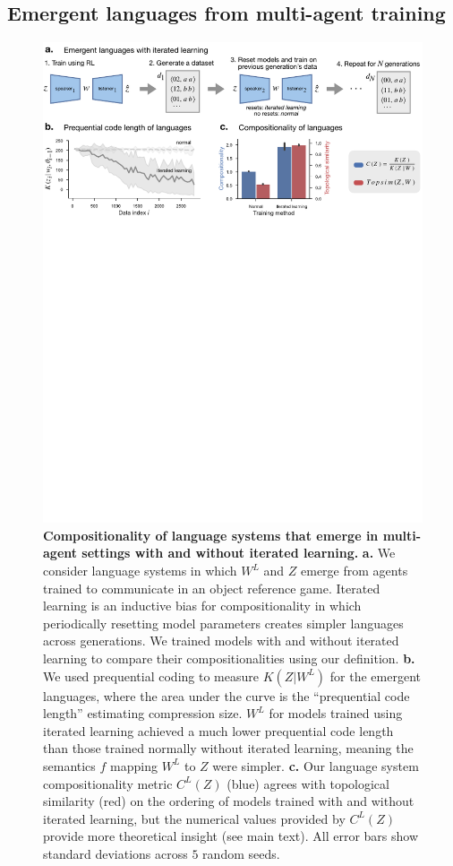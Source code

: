 \documentclass{article} %
\begin{document}
\subsection{Emergent languages from multi-agent training}
\label{sec:emergent}

\begin{figure}[ht]
    \centering
    \includegraphics[width=\linewidth]{figures/emergent.pdf}
    \caption{\textbf{Compositionality of language systems that emerge in multi-agent settings with and without iterated learning.} \textbf{a.} We consider language systems in which $W^L$ and $Z$ emerge from agents trained to communicate in an object reference game. Iterated learning is an inductive bias for compositionality in which periodically resetting model parameters creates simpler languages across generations. We trained models with and without iterated learning to compare their compositionalities using our definition. \textbf{b.} We used prequential coding to measure $K(Z | W^L)$ for the emergent languages, where the area under the curve is the ``prequential code length'' estimating compression size. $W^L$ for models trained using iterated learning achieved a much lower prequential code length than those trained normally without iterated learning, meaning the semantics $f$ mapping $W^L$ to $Z$ were simpler. \textbf{c.} Our language system compositionality metric $C^L(Z)$ (blue) agrees with topological similarity (red) on the ordering of models trained with and without iterated learning, but the numerical values provided by $C^L(Z)$ provide more theoretical insight (see main text). All error bars show standard deviations across $5$ random seeds.}
    \label{fig:emergent}
\end{figure}
\end{document}
